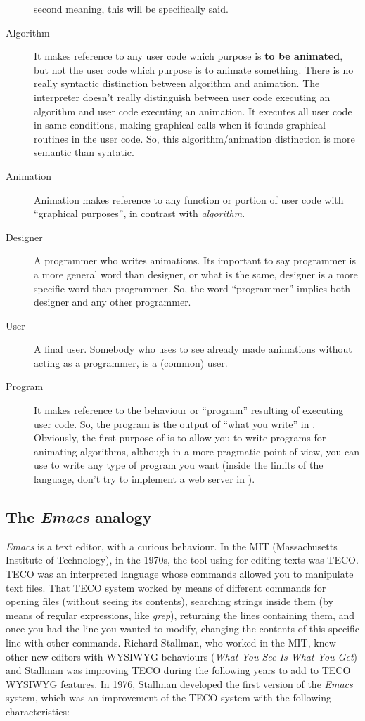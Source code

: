\documentclass{article}
\begin{document}
\begin{description}
    second meaning, this will be specifically said.
  \item[Algorithm] It makes reference to any user code which purpose is
    \textbf{to be animated}, but not the user code which purpose is to animate
    something. There is no really syntactic distinction between algorithm and
    animation. The \faupp interpreter doesn't really distinguish between
    user code executing an algorithm and user code executing an animation. It
    executes all user code in same conditions, making graphical calls when it
    founds graphical routines in the user code. So, this algorithm/animation
    distinction is more semantic than syntatic.
  \item[Animation] Animation makes reference to any function or portion of user
    code with ``graphical purposes'', in contrast with \textit{algorithm}.
  \item[Designer] A programmer who writes animations. Its important to say
    programmer is a more general word than designer, or what is the same,
    designer is a more specific word than programmer. So, the word ``programmer''
    implies both designer and any other programmer.
  \item[User] A final user. Somebody who uses \fav to see already made
    animations without acting as a programmer, is a (common) user.
  \item[Program] It makes reference to the behaviour or ``program'' resulting of
    executing user code. So, the program is the output of ``what you write'' in
    \faupp. Obviously, the first purpose of \faupp is to allow you to write
    programs for animating algorithms, although in a more pragmatic point of
    view, you can use \faupp to write any type of program you want (inside the
    limits of the language, don't try to implement a web server in \faupp).
\end{description}

\subsection{The \textit{Emacs} analogy}

\textit{Emacs} is a text editor, with a curious behaviour. In the MIT
(Massachusetts Institute of Technology), in the 1970s, the tool using for
editing texts was TECO. TECO was an interpreted language whose commands allowed
you to manipulate text files. That TECO system worked by means of different
commands for opening files (without seeing its contents), searching strings
inside them (by means of regular expressions, like \textit{grep}), returning the
lines containing them, and once you had the line you wanted to modify, changing
the contents of this specific line with other commands. Richard Stallman, who
worked in the MIT, knew other new editors with WYSIWYG behaviours (\textit{What
  You See Is What You Get}) and Stallman was improving TECO during the following
years to add to TECO WYSIWYG features. In 1976, Stallman developed the first
version of the \textit{Emacs} system, which was an improvement of the TECO
system with the following characteristics:
\end{document}
